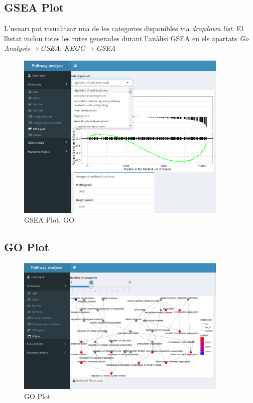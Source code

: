 \subsection{\gls{GSEA} Plot}
L'usuari pot visualitzar una de les categories disponibles via \textit{dropdown list}. El llistat inclou totes les rutes generades durant l'anàlisi GSEA en els apartats \textit{Go Analysis}$\rightarrow$\textit{GSEA}; \textit{KEGG}$\rightarrow$\textit{GSEA}
\begin{figure}[H]
\centering
\includegraphics[width=0.9\textwidth]{figures/App_F18_Items_GO_GSEA_Plot.png} 
\caption{\gls{GSEA} Plot. \gls{GO}.}
\end{figure}


\subsection{GO Plot}

\begin{figure}[H]
\centering
\includegraphics[width=0.9\textwidth]{figures/App_F19_Items_GO_GOPlot.png} 
\caption{\gls{GO} Plot}
\end{figure}


